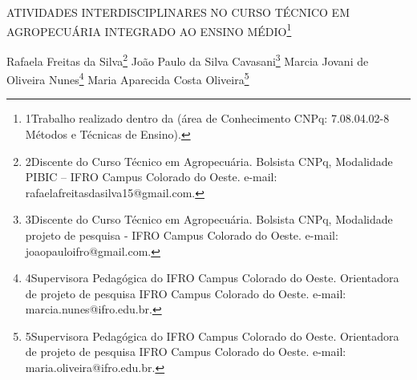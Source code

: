 \documentclass[article,12pt,onesidea,4paper,english,brazil]{abntex2}
\begin{document}
	
	
	\frenchspacing 
	
	\begin{center}
		\LARGE ATIVIDADES INTERDISCIPLINARES NO CURSO TÉCNICO EM AGROPECUÁRIA
		INTEGRADO AO ENSINO MÉDIO\footnote{1Trabalho realizado dentro da (área de Conhecimento CNPq: 7.08.04.02-8 Métodos e Técnicas de
			Ensino).}
		
		\normalsize
	Rafaela Freitas da Silva\footnote{2Discente do Curso Técnico em Agropecuária. Bolsista CNPq, Modalidade PIBIC – IFRO Campus
		Colorado do Oeste. e-mail: rafaelafreitasdasilva15@gmail.com.} 
		João Paulo da Silva Cavasani\footnote{3Discente do Curso Técnico em Agropecuária. Bolsista CNPq, Modalidade projeto de pesquisa - IFRO Campus Colorado do Oeste. e-mail: joaopauloifro@gmail.com.} 
	Marcia Jovani de Oliveira Nunes\footnote{4Supervisora Pedagógica do IFRO Campus Colorado do Oeste. Orientadora de projeto de pesquisa IFRO Campus Colorado do Oeste. e-mail: marcia.nunes@ifro.edu.br.} 
	Maria Aparecida Costa Oliveira\footnote{5Supervisora Pedagógica do IFRO Campus Colorado do Oeste. Orientadora de projeto de pesquisa
		IFRO Campus Colorado do Oeste. e-mail: maria.oliveira@ifro.edu.br.} 
	\end{center}
	
\end{document}
